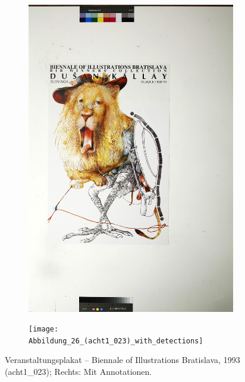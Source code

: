 \documentclass[a4paper,12pt,ngerman]{article}
\begin{document}
\newpage
\begin{landscape}
\begin{figure}[ht]
	\begin{subfigure}[b]{0.5\linewidth}
	\centering
	\includegraphics[height=\linewidth]{Abbildung_30_(acht1_023)}
	\end{subfigure}
	\begin{subfigure}[b]{0.5\linewidth}
	\centering
	\texttt{[image: Abbildung\_26\_(acht1\_023)\_with\_detections]}
	\end{subfigure}
	\caption{Veranstaltungsplakat – Biennale of Illustrations Bratislava, 1993 (acht1\_023); Rechts: Mit Annotationen.}
\end{figure}
\end{landscape}
\end{document}
